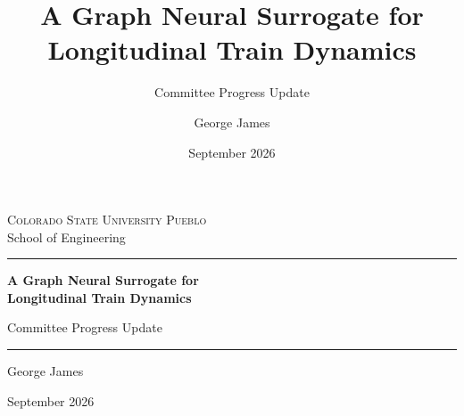 \documentclass[aspectratio=169,11pt]{beamer}
\title[Committee Progress Update]{A Graph Neural Surrogate for Longitudinal Train Dynamics}
\subtitle{Committee Progress Update}
\author[G. James]{George James}
\institute{School of Engineering\\Colorado State University Pueblo}
\date{September 2026}
\begin{document}
{%
\begin{frame}[plain]
  \vspace{0.6em}
  \begin{center}
    {\color{uniSlate}\footnotesize\textsc{Colorado State University Pueblo}
     \\[0.15em] \scriptsize School of Engineering}

    \vspace{1.0em}
    \color{uniCrimson}\rule{0.55\textwidth}{2pt}

    \vspace{0.9em}
    {\color{uniNavy}\LARGE\bfseries A Graph Neural Surrogate for\\[0.25em]
     Longitudinal Train Dynamics\par}

    \vspace{0.5em}
    {\color{uniSlate}\normalsize Committee Progress Update\par}

    \vspace{0.9em}
    \color{uniCrimson}\rule{0.55\textwidth}{2pt}

    \vspace{0.9em}
    {\color{uniInk}\large George James\par}
    \vspace{0.2em}
    {\color{uniSlate}\footnotesize September 2026\par}

    \vspace{0.7em}
    \scalebox{0.80}{\consistBand}
  \end{center}
\end{frame}
}
\end{document}
